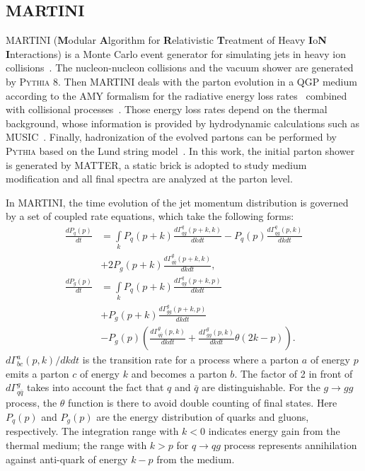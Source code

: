 \documentclass[aps,prc,twocolumn,floatfix,superscriptaddress,nofootinbib]{revtex4}
\begin{document}
\subsection{MARTINI}
\label{subsec:MARTINI}

MARTINI ({\bf M}odular {\bf A}lgorithm for {\bf R}elativistic {\bf T}reatment of Heavy {\bf I}o{\bf N} {\bf I}nteractions) is a Monte Carlo event generator for simulating jets in heavy ion collisions~\cite{Schenke:2009gb}. The nucleon-nucleon collisions and the vacuum shower are generated by \textsc{Pythia} 8. 
Then MARTINI deals with the parton evolution in a QGP medium according to the AMY formalism for the radiative energy loss rates~\cite{Arnold:2002ja,Arnold:2002zm} combined with collisional processes~\cite{Schenke:2009ik}.
Those energy loss rates depend on the thermal background, whose information is provided by hydrodynamic calculations such as MUSIC~\cite{Schenke:2010nt}.
Finally, hadronization of the evolved partons can be performed by \textsc{Pythia} based on the Lund string model~\cite{Andersson:1983ia}. In this work, the initial parton shower is generated by MATTER, a static brick is adopted to study medium modification and all final spectra are analyzed at the parton level.

In MARTINI, the time evolution of the jet momentum distribution is governed by a set of coupled rate equations, which take the following forms:
\begin{align} 
\label{eq:rateMAR}
	\frac{dP_q(p)}{dt} &= \int\limits_k P_q(p+k)\frac{d\Gamma^{q}_{qg}(p+k,k)}{dkdt}
	- P_q(p)\frac{d\Gamma^{q}_{qg}(p,k)}{dkdt}\nonumber\\
	& +2P_g(p+k)\frac{d\Gamma^g_{q\bar{q}}(p+k,k)}{dkdt},\nonumber\\
	\frac{dP_g(p)}{dt} &= \int\limits_k P_q(p+k)\frac{d\Gamma^{q}_{qg}(p+k,p)}{dkdt}\\
	&+P_g(p+k)\frac{d\Gamma^{g}_{gg}(p+k,p)}{dkdt}\nonumber\\
	&-P_g(p)\left(\frac{d\Gamma^g_{q\bar{q}}(p,k)}{dkdt} + \frac{d\Gamma^g_{gg}(p,k)}{dkdt}\theta(2k-p)\right).\nonumber
\end{align}
$d\Gamma^a_{bc}(p,k)/dkdt$ is the transition rate for a process where a parton $a$ of energy $p$ emits a parton $c$ of energy $k$ and becomes a parton $b$.
The factor of 2 in front of $d\Gamma^g_{q\bar{q}}$ takes into account the fact that $q$ and $\bar{q}$ are distinguishable.
For the $g \rightarrow gg$ process, the $\theta$ function is there to avoid double counting of final states. Here $P_q(p)$ and
$P_g(p)$ are the energy distribution of quarks and gluons, respectively. The integration range with $k<0$ indicates energy gain from the thermal medium; the range with $k>p$ for $q \rightarrow qg$ process represents annihilation against anti-quark of energy $k-p$ from the medium.  
\end{document}
